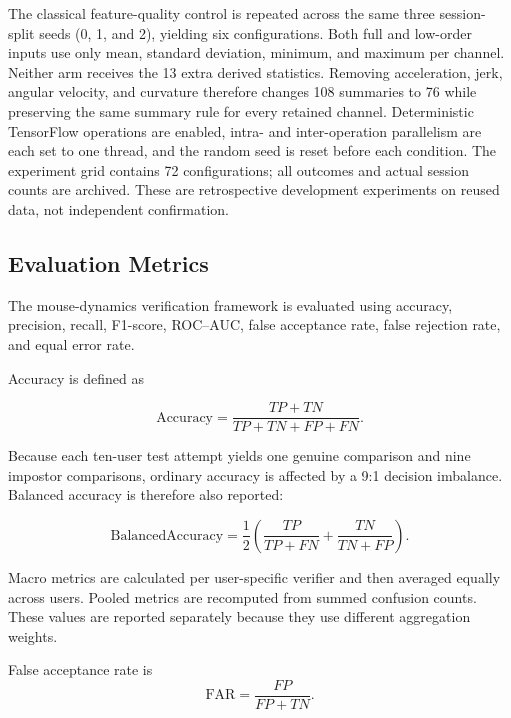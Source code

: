 \documentclass[conference]{IEEEtran}
\begin{document}
The classical feature-quality control is repeated across the same three
session-split seeds (0, 1, and 2), yielding six configurations.
Both full and low-order inputs use
only mean, standard deviation, minimum, and maximum per channel. Neither arm
receives the 13 extra derived statistics. Removing acceleration, jerk, angular
velocity, and curvature therefore changes 108 summaries to 76 while preserving
the same summary rule for every retained channel. Deterministic TensorFlow
operations are enabled, intra- and inter-operation parallelism are each set
to one thread, and the random seed is reset before each condition.
The experiment grid contains 72 configurations;
all outcomes and actual session counts are archived. These are retrospective
development experiments on reused data, not independent confirmation.

\subsection{Evaluation Metrics}

The mouse-dynamics verification framework is evaluated using accuracy, precision, recall, F1-score, ROC--AUC, false acceptance rate, false rejection rate, and equal error rate.

Accuracy is defined as

\begin{equation}
\mathrm{Accuracy}
=
\frac{TP+TN}{TP+TN+FP+FN}.
\label{eq:accuracy}
\end{equation}

Because each ten-user test attempt yields one genuine comparison and nine
impostor comparisons, ordinary accuracy is affected by a 9:1 decision
imbalance. Balanced accuracy is therefore also reported:

\begin{equation}
\mathrm{BalancedAccuracy}
=
\frac{1}{2}
\left(
\frac{TP}{TP+FN}
+
\frac{TN}{TN+FP}
\right).
\label{eq:balanced_accuracy}
\end{equation}

Macro metrics are calculated per user-specific verifier and then averaged
equally across users. Pooled metrics are recomputed from summed confusion
counts. These values are reported separately because they use different
aggregation weights.

False acceptance rate is
\begin{equation}
\mathrm{FAR}
=
\frac{FP}{FP+TN}.
\label{eq:far}
\end{equation}
\end{document}
